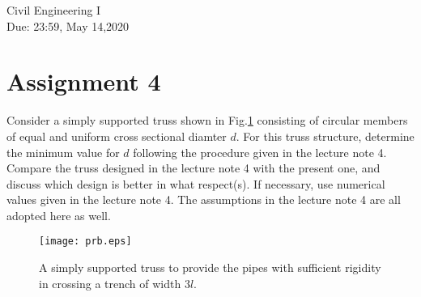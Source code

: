 \documentclass[10pt,a4j]{article}
\newlength{\minitwocolumn}
\begin{document}
\newcommand{\fat}[1]{\mbox{\boldmath $#1$}}
\newcommand{\D}{\partial}
\newcommand{\w}{\omega}
\newcommand{\ga}{\alpha}
\newcommand{\gb}{\beta}
\newcommand{\gx}{\xi}
\newcommand{\gz}{\zeta}
\newcommand{\vhat}[1]{\hat{\fat{#1}}}
\newcommand{\spc}{\vspace{0.7\baselineskip}}
\newcommand{\halfspc}{\vspace{0.3\baselineskip}}

\newcommand{\twofig}[2]
 {
   \begin{figure}
     \begin{minipage}[t]{\minitwocolumn}
         \begin{center}   #1
         \end{center}
     \end{minipage}
         \hspace{\columnsep}
     \begin{minipage}[t]{\minitwocolumn}
         \begin{center} #2
         \end{center}
     \end{minipage}
   \end{figure}
 }
\begin{flushright}
	{Civil Engineering I \\ 
	Due: 23:59, May 14,2020
	}
\end{flushright}
\hspace{10mm}
\section*{Assignment 4}
Consider a simply supported truss shown in Fig.\ref{fig:prb} consisting 
of circular members of equal and uniform cross sectional diamter $d$. 
For this truss structure, determine the minimum value for $d$ following 
the procedure given in the lecture note 4. Compare the truss designed 
in the lecture note 4 with the present one, and discuss which design is 
better in what respect(s). If necessary, use numerical values given 
in the lecture note 4. The assumptions in the lecture note 4 are all 
adopted here as well. 
    \begin{figure}[h]
        \begin{center}
        \texttt{[image: prb.eps]} 
        \end{center}
        \caption{
	A simply supported truss to provide the pipes with sufficient rigidity 
    	in crossing a trench of width $3l$.
	  } 
        \label{fig:prb}
    \end{figure}
\end{document}
